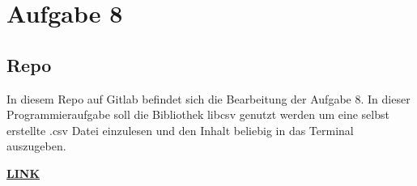 \chapter{Aufgabe 8}
\section{Repo}
In diesem Repo auf Gitlab befindet sich die Bearbeitung der Aufgabe 8.
In dieser Programmieraufgabe soll die Bibliothek libcsv genutzt werden um eine selbst erstellte .csv Datei einzulesen und den Inhalt beliebig in das Terminal auszugeben.
\par
\href{https://gitlab.thga.de/daniel.krueger/pruefung_sose_2023_aufgabe_8_csv}{\textbf{LINK}}
